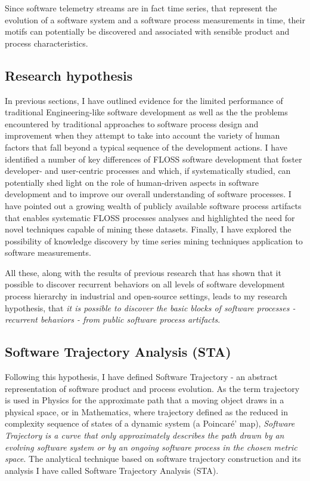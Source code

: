 Since software telemetry streams are in fact time series, that represent the evolution of a software system 
and a software process measurements in time, their motifs can potentially be discovered and associated with 
sensible product and process characteristics.

%
%
\subsection{Research hypothesis}\label{section_research_hypothesis}
In previous sections, I have outlined evidence for the limited performance of traditional Engineering-like 
software development as well as the the problems encountered by traditional approaches to software process 
design and improvement when they attempt to take into account the variety of human factors that fall beyond 
a typical sequence of the development actions.
I have identified a number of key differences of FLOSS software development that foster developer- and user-centric 
processes and which, if systematically studied, can potentially shed light on the role of human-driven aspects in 
software development and to improve our overall understanding of software processes. 
I have pointed out a growing wealth of publicly available software process artifacts that enables systematic FLOSS 
processes analyses and highlighted the need for novel techniques capable of mining these datasets.
Finally, I have explored the possibility of knowledge discovery by time series mining techniques application 
to software measurements.

All these, along with the results of previous research that has shown that it possible to discover 
recurrent behaviors on all levels of software development process hierarchy \cite{citeulike:8347315} 
in industrial \cite{citeulike:5090131} and open-source \cite{citeulike:10377345} settings, 
leads to my research hypothesis, that \textit{it is possible to discover the basic blocks of software 
processes - recurrent behaviors - from public software process artifacts}. 

\subsection{Software Trajectory Analysis (STA)}
Following this hypothesis, I have defined Software Trajectory - an abstract representation of software
product and process evolution. As the term trajectory is used in Physics for the approximate path that a 
moving object draws in a physical space, or in Mathematics, where trajectory defined as the reduced in 
complexity sequence of states of a dynamic system (a Poincar\'{e}' map), \textit{Software Trajectory is a curve
that only approximately describes the path drawn by an evolving software system or by an ongoing software 
process in the chosen metric space}. The analytical technique based on software trajectory construction
and its analysis I have called Software Trajectory Analysis (STA).

